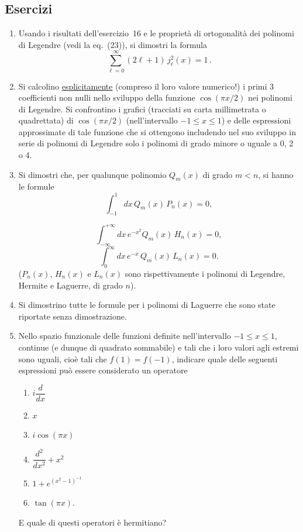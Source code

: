 \documentclass[11pt, a4paper]{book}
\numberwithin{equation}{section}
\newenvironment{esercizi}{\subsection*{Esercizi}\begin{enumerate}}{\end{enumerate}}
\begin{document}
\begin{esercizi}
\begin{enumerate}
\item Usando i risultati dell'esercizio~16 e le proprietà di ortogonalità dei polinomi di Legendre (vedi la eq.~(23)), si dimostri la formula
\[
\sum_{\ell=0}^{\infty}(2\ell+1)\,j_\ell^2(x) = 1\,.
\]

\item Si calcolino \uline{esplicitamente} (compreso il loro valore numerico!) i primi 3 coefficienti non nulli nello sviluppo della funzione $\cos(\pi x/2)$ %
nei polinomi di Legendre. Si confrontino i grafici (tracciati su carta millimetrata o quadrettata) di $\cos(\pi x/2)$ (nell'intervallo $-1\le x\le 1$) e delle espressioni approssimate di tale funzione che si ottengono includendo nel suo sviluppo in serie di polinomi di Legendre solo i polinomi di grado minore o uguale a 0, 2 o 4.

\item Si dimostri che, per qualunque polinomio $Q_m(x)$ di grado $m<n$, si hanno le formule
\[
\int_{-1}^{1}dx\,Q_m(x)\,P_n(x) = 0,
\]

\[
\int_{-\infty}^{+\infty}dx\,e^{-x^2}Q_m(x)\,H_n(x) = 0,
\]
\[
\int_0^{\infty}dx\,e^{-x}\,Q_m(x)\,L_n(x) = 0.
\]
($P_n(x)$, $H_n(x)$ e $L_n(x)$ sono rispettivamente i polinomi di Legendre, Hermite e Laguerre, di grado $n$).

\item[*] Si dimostrino tutte le formule per i polinomi di Laguerre che sono state riportate senza dimostrazione.

\item Nello spazio funzionale delle funzioni definite nell'intervallo $-1\le x\le 1$, continue (e dunque di quadrato sommabile) e tali che i loro valori agli estremi sono uguali, cioè tali che $f(1)=f(-1)$, indicare quale delle seguenti espressioni può essere considerato un operatore

\begin{enumerate}
\item[i)] $i\dfrac{d}{dx}$
\item[ii)] $x$
\item[iii)] $i\cos(\pi x)$
\item[iv)] $\dfrac{d^2}{dx^2}+x^2$
\item[v)] $1+e^{(x^2-1)^{-1}}$
\item[vi)] $\tan(\pi x)$.
\end{enumerate}
E quale di questi operatori è hermitiano?


\end{enumerate}
\end{esercizi}
\end{document}
